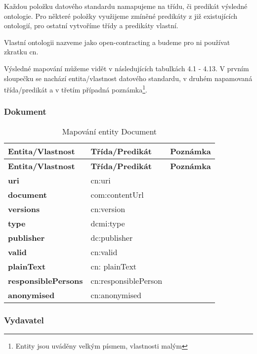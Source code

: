 Každou položku datového standardu namapujeme na třídu, či predikát výsledné ontologie. Pro některé položky využijeme zmíněné predikáty z již existujících ontologií, pro ostatní vytvoříme třídy a predikáty vlastní. 

Vlastní ontologii nazveme jako open-contracting a budeme pro ni používat zkratku cn.  

Výsledné mapování můžeme vidět v následujících tabulkách 4.1 - 4.13. V prvním sloupečku se nachází entita/vlastnost datového standardu, v druhém napamovaná třída/predikát a v třetím případná poznámka\footnote{Entity jsou uváděny velkým písmem, vlastnosti malým}.

\subsubsection*{Dokument}

\begin{center}
\begin{longtable}{lll}
\label{grid_mlmmh} \\
\multicolumn{1}{l}{\textbf{Entita/Vlastnost}} & 
\multicolumn{1}{l}{\textbf{Třída/Predikát}} & 
\multicolumn{1}{l}{\textbf{Poznámka}} \\ \hline 
\endfirsthead
\multicolumn{1}{l}{\textbf{Entita/Vlastnost}} & 
\multicolumn{1}{l}{\textbf{Třída/Predikát}} & 
\multicolumn{1}{l}{\textbf{Poznámka}} \\ \hline 
\hline
\endhead
\endfoot
\caption{Mapování entity Document}
\endlastfoot
\textbf{uri} & cn:uri \\
\textbf{document} & com:contentUrl \\
\textbf{versions} & cn:version \\
\textbf{type} & dcmi:type \\
\textbf{publisher} & dc:publisher \\
\textbf{valid} & cn:valid \\
\textbf{plainText} & cn: plainText \\
\textbf{responsiblePersons} & cn:responsiblePerson \\
\textbf{anonymised} & cn:anonymised \\
\end{longtable}
\end{center}

\newpage

\subsubsection*{Vydavatel}

